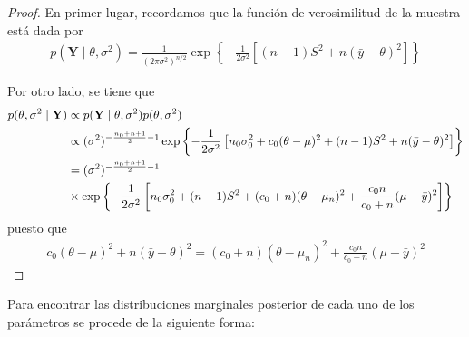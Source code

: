 \documentclass[
  10pt,
  spanish,
]{book}
\theoremstyle{definition}
\theoremstyle{definition}
\theoremstyle{definition}
\theoremstyle{definition}
\theoremstyle{remark}
\begin{document}
\begin{proof}
{}En primer lugar, recordamos que la función de verosimilitud de la muestra está dada por
\begin{align}
p(\mathbf{Y} \mid \theta,\sigma^2)= \frac{1}{(2\pi\sigma^2)^{n/2}}
\exp\left\{-\frac{1}{2\sigma^2}\left[(n-1)S^2+n(\bar{y}-\theta)^2\right]\right\}
\end{align}

Por otro lado, se tiene que
\begin{align}
\label{eq:desarro1}
p(\theta,\sigma^2 \mid \mathbf{Y}) & \propto p(\mathbf{Y} \mid \theta,\sigma^2)p(\theta,\sigma^2)\notag\\
&\propto (\sigma^2)^{-\frac{n_0+n+1}{2}-1}
\exp\left\{-\frac{1}{2\sigma^2}\left[n_0\sigma^2_0+c_0(\theta-\mu)^2+(n-1)S^2+n(\bar{y}-\theta)^2\right]\right\}\notag\\
&= (\sigma^2)^{-\frac{n_0+n+1}{2}-1}\\
&\times
\exp\left\{-\frac{1}{2\sigma^2}\left[n_0\sigma^2_0+(n-1)S^2+(c_0+n)(\theta-\mu_n)^2+\frac{c_0n}{c_0+n}(\mu-\bar{y})^2\right]\right\}
\end{align}
puesto que
\begin{align*}
c_0(\theta-\mu)^2+n(\bar{y}-\theta)^2=(c_0+n)(\theta-\mu_n)^2+\frac{c_0n}{c_0+n}(\mu-\bar{y})^2
\end{align*}
\end{proof}

Para encontrar las distribuciones marginales posterior de cada uno de los parámetros se procede de la siguiente forma:
\end{document}
